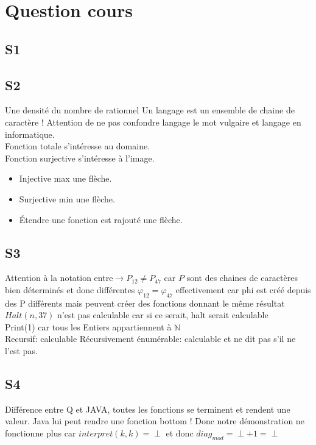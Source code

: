 \documentclass{report}
\begin{document}
\chapter{Question cours}
\section{S1}

\section{S2}
Une densité du nombre de rationnel
Un langage est un ensemble de chaine de caractère ! Attention de ne pas confondre langage le mot vulgaire et langage en informatique.\\
Fonction totale s'intéresse au domaine.\\
Fonction surjective s'intéresse à l'image.\\
\begin{itemize}
\item Injective max une flèche.
\item Surjective min une flèche.
\item Étendre une fonction est rajouté une flèche.
\end{itemize}

\section{S3}
Attention à la notation entre$ \rightarrow P_{12} \neq P_{47}$ car $P$ sont des chaines de caractères bien déterminés et donc différentes
$\varphi_{12}=\varphi_{47}$ effectivement car phi est créé depuis des P différents mais peuvent créer des fonctions donnant le même résultat\\

$Halt(n,37)$ n'est pas calculable car si ce serait, halt serait calculable\\
Print(1) car tous les Entiers appartiennent à $\mathbb{N}$\\

Recursif: calculable
Récursivement énumérable: calculable et ne dit pas s'il ne l'est pas.

\section{S4}
Différence entre Q et JAVA, toutes les fonctions se terminent et rendent une valeur. 
Java lui peut rendre une fonction bottom !
Donc notre démonstration ne fonctionne plus car $interpret(k,k)= \perp$ et donc $diag_{mod}= \perp+1= \perp$\\
\end{document}
